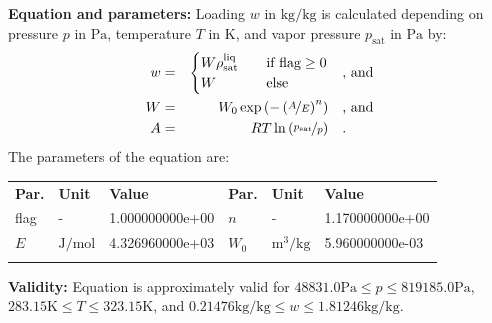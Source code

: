 \textbf{Equation and parameters:}
\newline
%
Loading $w$ in $\si{\kilogram\per\kilogram}$ is calculated depending on pressure $p$ in $\si{\pascal}$, temperature $T$ in $\si{\kelvin}$, and vapor pressure $p_\mathrm{sat}$ in $\si{\pascal}$ by:
%
\begin{equation*}
\begin{split}
w &=& \begin{cases} W \rho_\mathrm{sat}^{\mathrm{liq}} & \quad \text{if flag} \geq 0 \\ W & \quad \text{else} \end{cases} & \quad\text{, and} \\
W &=& W_0 \exp \left( - \left( \nicefrac{A}{E} \right) ^{n} \right) & \quad\text{, and} \\
A &=& R T \ln \left( \nicefrac{p_\mathrm{sat}}{p} \right) & \quad\text{.} \\
\end{split}
\end{equation*}
%
The parameters of the equation are:
%
\begin{longtable}[l]{lll|lll}
\toprule
\addlinespace
\textbf{Par.} & \textbf{Unit} & \textbf{Value} &	\textbf{Par.} & \textbf{Unit} & \textbf{Value} \\
\addlinespace
\midrule
\endhead

\bottomrule
\endfoot
\bottomrule
\endlastfoot
\addlinespace

flag & - & 1.000000000e+00 & $n$ & - & 1.170000000e+00 \\
$E$ & $\si{\joule\per\mole}$ & 4.326960000e+03 & $W_0$ & $\si{\cubic\meter\per\kilogram}$ & 5.960000000e-03 \\

\addlinespace\end{longtable}

\textbf{Validity:}
\newline
Equation is approximately valid for $48831.0 \si{\pascal} \leq p \leq 819185.0 \si{\pascal}$,  $283.15 \si{\kelvin} \leq T \leq 323.15 \si{\kelvin}$, and $0.21476 \si{\kilogram\per\kilogram} \leq w \leq 1.81246 \si{\kilogram\per\kilogram}$.
\newline

